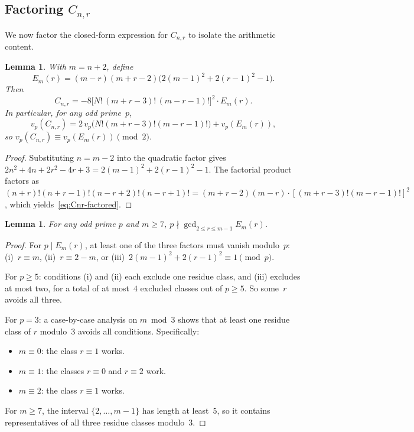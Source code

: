 \documentclass[10pt]{amsart}
\newtheorem{lemma}[theorem]{Lemma}
\theoremstyle{definition}
\theoremstyle{remark}
\begin{document}
\subsection{Factoring $C_{n,r}$}

We now factor the closed-form expression for $C_{n,r}$ to isolate the arithmetic content.

\begin{lemma}\label{lem:factor}
With $m=n+2$, define
\begin{equation}\label{eq:Em}
E_m(r) = (m-r)(m+r-2)\bigl(2(m-1)^2+2(r-1)^2-1\bigr).
\end{equation}
Then
\begin{equation}\label{eq:Cnr-factored}
C_{n,r} = -8\bigl[N!\,(m+r-3)!\,(m-r-1)!\bigr]^2 \cdot E_m(r).
\end{equation}
In particular, for any odd prime~$p$,
\begin{equation}\label{eq:vp-Cnr}
v_p(C_{n,r}) = 2\,v_p\bigl(N!(m+r-3)!(m-r-1)!\bigr) + v_p(E_m(r)),
\end{equation}
so $v_p(C_{n,r}) \equiv v_p(E_m(r)) \pmod{2}$.
\end{lemma}

\begin{proof}
Substituting $n=m-2$ into the quadratic factor gives
$2n^2+4n+2r^2-4r+3 = 2(m-1)^2+2(r-1)^2-1$.
The factorial product factors as
$(n+r)!(n+r-1)!(n-r+2)!(n-r+1)! = (m+r-2)(m-r)\cdot[(m+r-3)!(m-r-1)!]^2$,
which yields~\eqref{eq:Cnr-factored}.
\end{proof}

\begin{lemma}\label{lem:Egcd}
For any odd prime $p$ and $m \ge 7$,
$p \nmid \gcd_{2 \le r \le m-1} E_m(r)$.
\end{lemma}

\begin{proof}
For $p \mid E_m(r)$, at least one of the three factors must vanish
modulo~$p$: (i)~$r \equiv m$, (ii)~$r \equiv 2-m$, or
(iii)~$2(m-1)^2+2(r-1)^2 \equiv 1 \pmod{p}$.

For $p \ge 5$: conditions (i) and (ii) each exclude one residue class,
and (iii) excludes at most two, for a total of at most~$4$ excluded classes
out of $p \ge 5$.  So some~$r$ avoids all three.

For $p = 3$: a case-by-case analysis on $m \bmod 3$ shows that at least one
residue class of $r$ modulo~$3$ avoids all conditions.  Specifically:
\begin{itemize}
\item $m \equiv 0$: the class $r \equiv 1$ works.
\item $m \equiv 1$: the classes $r \equiv 0$ and $r \equiv 2$ work.
\item $m \equiv 2$: the class $r \equiv 1$ works.
\end{itemize}
For $m \ge 7$, the interval $\{2,\dots,m-1\}$ has length at least~$5$,
so it contains representatives of all three residue classes modulo~$3$.
\end{proof}
\end{document}
